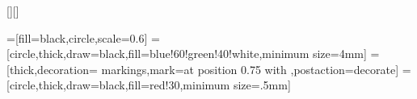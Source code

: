 \usepackage{amsmath}
\usepackage{amssymb}
\usepackage{cancel}
\usepackage{amsthm}
\usepackage{mathrsfs}
\usepackage[dvipsnames]{xcolor}
\usepackage{graphicx}
\usepackage{epigraph}
\usepackage{booktabs}
\usepackage{relsize}
\usepackage{hyperref}
\usepackage{multicol}
  \setlength{\columnsep}{3cm}
\usepackage{floatrow}
	[][\FBwidth]
\usepackage{kbordermatrix}
\usepackage{transparent}
\usepackage[normalem]{ulem}
\hypersetup{colorlinks} 
\hypersetup{ %
    colorlinks=true,    
    linkcolor =RubineRed,
    citecolor=RubineRed
}

\usepackage{array}

\usepackage[shortlabels]{enumitem}

\usepackage{tikz}
\usetikzlibrary{cd,calc, arrows, shapes, matrix, positioning, intersections, decorations.markings, arrows.meta, decorations.pathmorphing}
	=[fill=black,circle,scale=0.6]
  =[circle,thick,draw=black,fill=blue!60!green!40!white,minimum size=4mm]
   = [thick,decoration={
      markings,mark=at position 0.75 with {\arrow[scale=1.5,>=stealth]{>}}},postaction={decorate}]
  =[circle,thick,draw=black,fill=red!30,minimum size=.5mm] 


\newcommand{\ar}[1]{\xrightarrow{\ensuremath{#1}}}


\newcommand{\V}{\mathcal{V}}
\renewcommand{\C}{\mathsf{C}}
\newcommand{\D}{\mathsf{D}}
\newcommand{\E}{\mathsf{E}}
\renewcommand{\o}{{\color{YellowOrange}o}}
\newcommand{\g}{{\color{Green}g}}
\newcommand{\p}{{\color{Purple}p}}
\newcommand{\<}{\langle}
\renewcommand{\>}{\rangle}
\newenvironment{bsmallmatrix}
  {\left[\begin{smallmatrix}}
  {\end{smallmatrix}\right]}
\let\emph\relax %
\DeclareTextFontCommand{\emph}{\bfseries}




\newcommand{\End}{\operatorname{End}}
\newcommand{\op}{\operatorname{op}}
\newcommand{\tr}{\operatorname{tr}}
\DeclareMathOperator{\id}{id}
\DeclareMathOperator{\eval}{eval}

